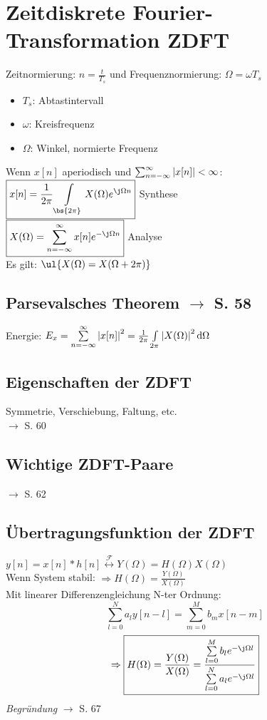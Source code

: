 \documentclass[german]{latex4ei/latex4ei_sheet}
\renewcommand{\diff}{\mathop{}\!\mathrm{\vphantom( d}}
\begin{document}
\section{Zeitdiskrete Fourier-Transformation ZDFT}
\begin{sectionbox}
Zeitnormierung: $n = \frac{t}{T_s}$ und Frequenznormierung: $\Omega = \omega T_s$
\begin{itemize}
	\item $T_s$: Abtastintervall
	\item $\omega$: Kreisfrequenz
	\item $\Omega$: Winkel, normierte Frequenz
\end{itemize}
Wenn $x[n]$ aperiodisch und $\sum_{n = -\infty}^{\infty}{\abs{x[n]}} < \infty$:\\
$\boxed{x[n] = \frac{1}{2 \pi}\int\limits_{\bs{2 \pi}}{X(\Omega) e^{\j \Omega n}}}$ \hfill Synthese\\
$\boxed{X(\Omega) = \sum\limits_{n = -\infty}^{\infty}{x[n] e^{-\j \Omega n}}}$ \hfill Analyse\\
Es gilt: $\ul{X(\Omega) = X(\Omega + 2 \pi)}$

	\subsection*{Parsevalsches Theorem $\rightarrow$ S. 58}
	Energie: $E_x = \sum\limits_{n = -\infty}^{\infty}{\abs{x[n]}^2} = \frac{1}{2 \pi}\int\limits_{2 \pi}{\abs{X(\Omega)}^2 \diff \Omega}$
	
	\subsection*{Eigenschaften der ZDFT}
	Symmetrie, Verschiebung, Faltung, etc.\\
	$\rightarrow$ S. 60
	
	\subsection*{Wichtige ZDFT-Paare}
	$\rightarrow$ S. 62
	
	\subsection*{Übertragungsfunktion der ZDFT}
	$y[n] = x[n] \ast h[n] \stackrel{\mathcal{F}}{\longleftrightarrow} Y(\Omega) = H(\Omega) X(\Omega)$\\
	Wenn System stabil: $\Rightarrow \boxed{H(\Omega) = \frac{Y(\Omega)}{X(\Omega)}}$\\
	Mit linearer Differenzengleichung N-ter Ordnung:
	\[\sum\limits_{l=0}^{N}{a_l y[n - l]} = \sum\limits_{m = 0}^{M}{b_m x[n - m]}\]
	\[\Rightarrow \boxed{H(\Omega) = \frac{Y(\Omega)}{X(\Omega)} = \frac{\sum\limits_{l=0}^{M}{b_l e^{-\j\Omega l}}}{\sum\limits_{l=0}^{N}{a_l e^{-\j\Omega l}}}}\]
	\emph{Begründung} $\rightarrow$ S. 67
	
	\end{sectionbox}
\end{document}

